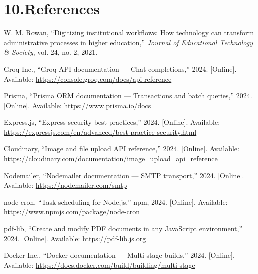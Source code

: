 \documentclass[12pt,a4paper]{report}
\begin{document}
\chapter*{10.\quad References}

\begin{enumerate}[leftmargin=1.5em, label={[\arabic*]}]

    \item W. M. Rowan, ``Digitizing institutional workflows: How technology can transform administrative processes in higher education,'' \textit{Journal of Educational Technology \& Society}, vol. 24, no. 2, 2021.

    \item Groq Inc., ``Groq API documentation --- Chat completions,'' 2024. [Online]. Available: \url{https://console.groq.com/docs/api-reference}

    \item Prisma, ``Prisma ORM documentation --- Transactions and batch queries,'' 2024. [Online]. Available: \url{https://www.prisma.io/docs}

    \item Express.js, ``Express security best practices,'' 2024. [Online]. Available: \url{https://expressjs.com/en/advanced/best-practice-security.html}

    \item Cloudinary, ``Image and file upload API reference,'' 2024. [Online]. Available: \url{https://cloudinary.com/documentation/image_upload_api_reference}

    \item Nodemailer, ``Nodemailer documentation --- SMTP transport,'' 2024. [Online]. Available: \url{https://nodemailer.com/smtp}

    \item node-cron, ``Task scheduling for Node.js,'' npm, 2024. [Online]. Available: \url{https://www.npmjs.com/package/node-cron}

    \item pdf-lib, ``Create and modify PDF documents in any JavaScript environment,'' 2024. [Online]. Available: \url{https://pdf-lib.js.org}

    \item Docker Inc., ``Docker documentation --- Multi-stage builds,'' 2024. [Online]. Available: \url{https://docs.docker.com/build/building/multi-stage}

\end{enumerate}
\end{document}
